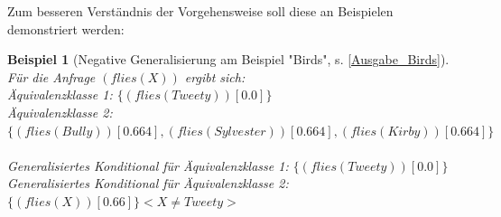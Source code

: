\documentclass[a4paper, 11pt]{book}
\newtheorem{Bsp}{Beispiel}[section]
\begin{document}
Zum besseren Verständnis der Vorgehensweise soll diese an Beispielen demonstriert werden:
\begin{Bsp}[Negative Generalisierung am Beispiel "{}Birds"{}, s. \ref{Ausgabe_Birds}]
	\label{Bsp:Neg_Gen_Birds} Für die Anfrage $ (flies(X)) $ ergibt sich: \\
	
	\noindent
	Äquivalenzklasse 1: $\{(flies(Tweety))[0.0]\}$\\
	Äquivalenzklasse 2: $\{(flies(Bully))[0.664], (flies(Sylvester))[0.664], (flies(Kirby))[0.664]\}$\\
	\\
Generalisiertes Konditional für Äquivalenzklasse 1: $\{(flies(Tweety))[0.0]\}$\\
Generalisiertes Konditional für Äquivalenzklasse 2: $\{(flies(X))[0.66]\} <X \neq Tweety>$\\
\end{Bsp}
 
\end{document}
